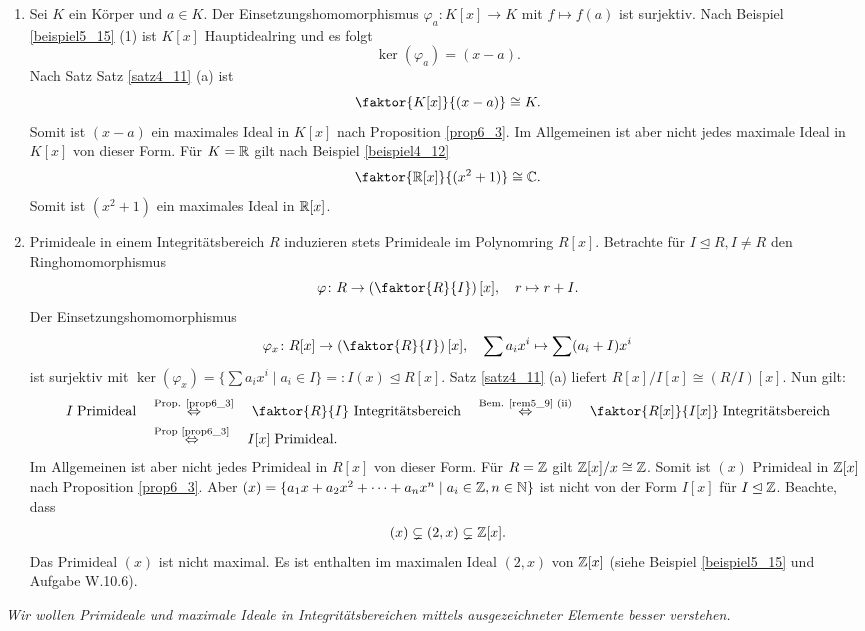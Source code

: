 \begin{beispiel}\label{beispiel6_5}
	\begin{enumerate}[label=(\arabic*)]
		\item Sei $K$ ein Körper und $a \in K$. Der Einsetzungshomomorphismus $\varphi_a \colon K[x] \to K$ mit $f \mapsto f(a)$ ist surjektiv. Nach Beispiel \ref{beispiel5_15} (1) ist $K[x]$ Hauptidealring und es folgt
		\[\ker(\varphi_a) = (x-a).\]
		Nach Satz Satz \ref{satz4_11} (a) ist
		\[\faktor{K[x]}{(x-a)} \cong K.\]
		Somit ist $(x-a)$ ein maximales Ideal in $K[x]$ nach Proposition \ref{prop6_3}. Im Allgemeinen ist aber nicht jedes maximale Ideal in $K[x]$ von dieser Form. Für $K = \mathbb{R}$ gilt nach Beispiel \ref{beispiel4_12} 
		\[\faktor{\R[x]}{(x^2 + 1)} \cong \C.\]
		Somit ist $(x^2 + 1)$ ein maximales Ideal in $\mathbb{R}[x]$.
		\item Primideale in einem Integritätsbereich $R$ induzieren stets Primideale im Polynomring $R[x]$. Betrachte für $I \unlhd R, I \neq R$ den Ringhomomorphismus
		\[\varphi \colon R \to \left(\faktor{R}{I}\right)[x],\quad r \mapsto r + I.\]
		Der Einsetzungshomomorphismus
		\[\varphi_x \colon R[x] \to \left(\faktor{R}{I}\right)[x], \quad \sum a_i x^i \mapsto \sum (a_i + I) x^i\]
		ist surjektiv mit $\ker(\varphi_x) = \{\sum a_i x^i \mid a_i \in I\} =: I(x) \unlhd R[x]$. Satz \ref{satz4_11} (a) liefert $R[x] / I[x] \cong (R/I)[x]$. Nun gilt:
		\begin{align*}I \;\text{Primideal}  \quad&\overset{\text{Prop. \ref{prop6_3}}}{\Leftrightarrow}\quad \faktor{R}{I} \text{ Integritätsbereich} \quad\overset{\text{Bem. \ref{rem5_9} (ii)}}{\Leftrightarrow}\quad \faktor{R[x]}{I[x]} \; \text{Integritätsbereich}\\
	  &\overset{\text{Prop \ref{prop6_3}}}{\Leftrightarrow}\quad I[x] \; \text{Primideal}.\end{align*}		
		Im Allgemeinen ist aber nicht jedes Primideal in $R[x]$ von dieser Form. Für $R=\mathbb{Z}$ gilt $\mathbb{Z}[x] / x \cong \mathbb{Z}$. Somit ist $(x)$ Primideal in $\mathbb{Z}[x]$ nach Proposition \ref{prop6_3}. Aber $(x) = \{a_1 x + a_2 x^2 + \dots + a_n x^n \mid a_i \in \mathbb{Z}, n \in \mathbb{N}\}$ ist nicht von der Form $I[x]$ für $I \unlhd \mathbb{Z}$. Beachte, dass 
		\begin{align*}
			(x) \subsetneq (2,x) \subsetneq \mathbb{Z}[x].
		\end{align*}
		Das Primideal $(x)$ ist nicht maximal. Es ist enthalten im maximalen Ideal $(2,x)$ von $\mathbb{Z}[x]$ (siehe Beispiel \ref{beispiel5_15} und Aufgabe W.10.6).
 	\end{enumerate} 
\end{beispiel}
\begin{leftbar}
	\textit{Wir wollen Primideale und maximale Ideale in Integritätsbereichen mittels ausgezeichneter Elemente besser verstehen.}
\end{leftbar}


